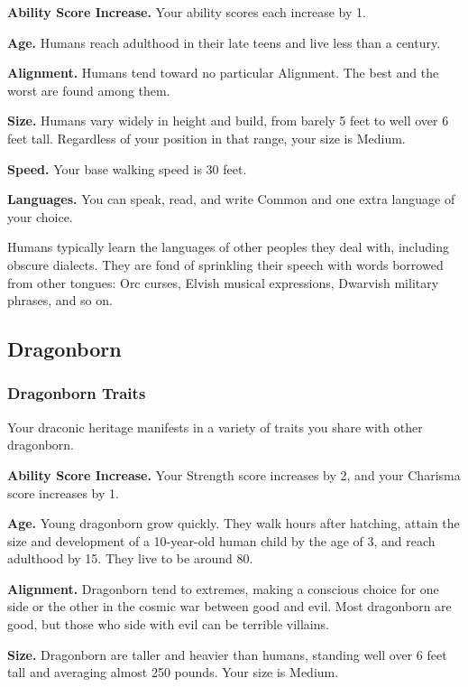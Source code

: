 \documentclass[
]{article}
\begin{document}
\textbf{Ability Score Increase.} Your ability scores each increase by 1.

\textbf{Age.} Humans reach adulthood in their late teens and live less
than a century.

\textbf{Alignment.} Humans tend toward no particular Alignment. The best
and the worst are found among them.

\textbf{Size.} Humans vary widely in height and build, from barely 5
feet to well over 6 feet tall. Regardless of your position in that
range, your size is Medium.

\textbf{Speed.} Your base walking speed is 30 feet.

\textbf{Languages.} You can speak, read, and write Common and one extra
language of your choice.

Humans typically learn the languages of other peoples they deal with,
including obscure dialects. They are fond of sprinkling their speech
with words borrowed from other tongues: Orc curses, Elvish musical
expressions, Dwarvish military phrases, and so on.

\hypertarget{dragonborn}{%
\subsection{Dragonborn}\label{dragonborn}}

\hypertarget{dragonborn-traits}{%
\subsubsection{Dragonborn Traits}\label{dragonborn-traits}}

Your draconic heritage manifests in a variety of traits you share with
other dragonborn.

\textbf{Ability Score Increase.} Your Strength score increases by 2, and
your Charisma score increases by 1.

\textbf{Age.} Young dragonborn grow quickly. They walk hours after
hatching, attain the size and development of a 10-year-old human child
by the age of 3, and reach adulthood by 15. They live to be around 80.

\textbf{Alignment.} Dragonborn tend to extremes, making a conscious
choice for one side or the other in the cosmic war between good and
evil. Most dragonborn are good, but those who side with evil can be
terrible villains.

\textbf{Size.} Dragonborn are taller and heavier than humans, standing
well over 6 feet tall and averaging almost 250 pounds. Your size is
Medium.
\end{document}
